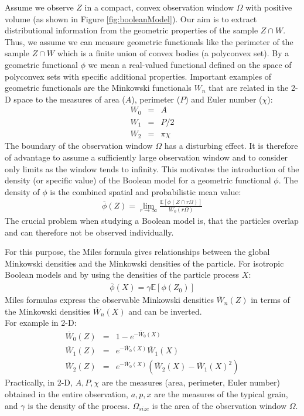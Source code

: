 Assume we observe $Z$ in a compact, convex observation window $\Omega$ with positive volume (as shown in Figure \ref{fig:booleanModel}).
Our aim is to extract distributional information from the geometric properties of the sample $Z \cap W$. Thus, we assume we can measure geometric functionals like the perimeter of the sample $Z \cap W$ which is a finite union of convex bodies (a polyconvex set). By a geometric functional $\phi$ we mean a real-valued functional defined on the space of polyconvex sets with specific additional properties. Important examples of geometric functionals are the Minkowski functionals $W_{n}$ that are related in the 2-D space to the measures of area ($A$), perimeter ($P$) and Euler number ($\chi$):
\begin{eqnarray}
W_0&=&A\\
W_1&=&P/2\\
W_2&=&\pi \chi
\end{eqnarray}
%
The boundary of the observation window $\Omega$ has a disturbing effect. It is therefore of advantage to assume a sufficiently large observation
window and to consider only limits as the window tends to infinity. This motivates the introduction of the density (or specific value) of the Boolean model for a geometric functional $\phi$. The density of $\phi$ is the combined spatial and probabilistic mean value:\vspace*{-8pt}
\begin{eqnarray}
\overline{\phi}(Z)=\lim_{r\rightarrow\infty}\frac{\mathbb{E}[\phi(Z\cap r\Omega)]}{W_0(r\Omega)}
\end{eqnarray}
The crucial problem when studying a Boolean model is, that the particles overlap and can therefore not be observed individually.

For this purpose, the Miles formula gives relationships between the global Minkowski densities and the Minkowski densities of the particle.
For isotropic Boolean models and by using the densities of the particle process $X$:
\begin{eqnarray}
\overline{\phi}(X)=\gamma\mathbb{E}[\phi(Z_0)]
\end{eqnarray}
Miles formulas express the observable Minkowski densities $\overline{W}_{n}(Z)$ in terms of the Minkowski densities $\overline{W}_{n}(X)$ and can be inverted.\\
For example in 2-D: \vspace*{-8pt}
\begin{eqnarray}
\overline{W}_0(Z)&=&1-e^{-\overline{W}_0(X)}\\
\overline{W}_1(Z)&=&e^{-\overline{W}_0(X)}\overline{W}_1(X)\label{eq:miles2}\\
\overline{W}_2(Z)&=&e^{-\overline{W}_0(X)}\left(\overline{W}_2(X)-\overline{W}_1(X)^2\right)\label{eq:miles3}
\end{eqnarray}
Practically, in 2-D, $A,P,\chi$ are the measures (area, perimeter, Euler number) obtained in the entire observation, $a,p,x$ are the measures of the typical grain, and $\gamma$ is the density of the process. $\Omega_{size}$ is the area of the observation window $\Omega$.

